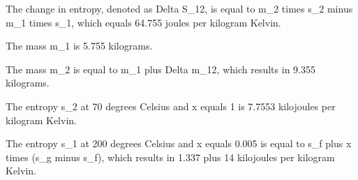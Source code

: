 The change in entropy, denoted as Delta S_12, is equal to m_2 times s_2 minus m_1 times s_1, which equals 64.755 joules per kilogram Kelvin.

The mass m_1 is 5.755 kilograms.

The mass m_2 is equal to m_1 plus Delta m_12, which results in 9.355 kilograms.

The entropy s_2 at 70 degrees Celsius and x equals 1 is 7.7553 kilojoules per kilogram Kelvin.

The entropy s_1 at 200 degrees Celsius and x equals 0.005 is equal to s_f plus x times (s_g minus s_f), which results in 1.337 plus 14 kilojoules per kilogram Kelvin.